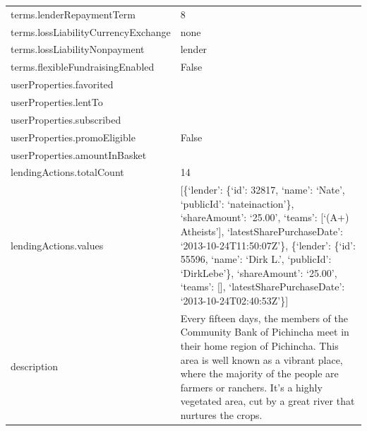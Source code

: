 \begin{longtable}{|p{}|p{}|}
	terms.lenderRepaymentTerm                       & 8                                                                   \\
	terms.lossLiabilityCurrencyExchange             & none                                                                \\
	terms.lossLiabilityNonpayment                   & lender                                                              \\
	terms.flexibleFundraisingEnabled                & False                                                               \\
	userProperties.favorited                        &                                                                     \\
	userProperties.lentTo                           &                                                                     \\
	userProperties.subscribed                       &                                                                     \\
	userProperties.promoEligible                    & False                                                               \\
	userProperties.amountInBasket                   &                                                                     \\
	lendingActions.totalCount                       & 14                                                                  \\
	lendingActions.values                           & {[}\{`lender': \{`id': 32817, `name': `Nate',
	`publicId': `nateinaction'\}, `shareAmount': `25.00', `teams': {[}`(A+)
	Atheists'{]}, `latestSharePurchaseDate': `2013-10-24T11:50:07Z'\},
	\{`lender': \{`id': 55596, `name': `Dirk L.', `publicId': `DirkLebe'\},
	`shareAmount': `25.00', `teams': {[}{]}, `latestSharePurchaseDate':
	`2013-10-24T02:40:53Z'\}{]}                                                                                           \\
	description                                     & Every fifteen days, the members of the Community Bank of
	Pichincha meet in their home region of Pichincha. This area is well
	known as a vibrant place, where the majority of the people are farmers
	or ranchers. It's a highly vegetated area, cut by a great river that
	nurtures the crops.                                                                                                   \\

\end{longtable}

